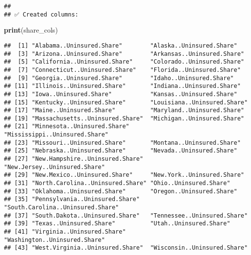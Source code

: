 \documentclass[
]{article}
\newenvironment{Shaded}{\begin{snugshade}}{\end{snugshade}}
\newcommand{\AttributeTok}[1]{\textcolor[rgb]{0.13,0.29,0.53}{#1}}
\newcommand{\CommentTok}[1]{\textcolor[rgb]{0.56,0.35,0.01}{\textit{#1}}}
\newcommand{\ConstantTok}[1]{\textcolor[rgb]{0.56,0.35,0.01}{#1}}
\newcommand{\FunctionTok}[1]{\textcolor[rgb]{0.13,0.29,0.53}{\textbf{#1}}}
\newcommand{\NormalTok}[1]{#1}
\newcommand{\OtherTok}[1]{\textcolor[rgb]{0.56,0.35,0.01}{#1}}
\newcommand{\SpecialCharTok}[1]{\textcolor[rgb]{0.81,0.36,0.00}{\textbf{#1}}}
\newcommand{\StringTok}[1]{\textcolor[rgb]{0.31,0.60,0.02}{#1}}
\begin{document}
\begin{Shaded}
\end{Shaded}

\begin{verbatim}
## 
## ✅ Created columns:
\end{verbatim}

\begin{Shaded}
\begin{Highlighting}[]
\FunctionTok{print}\NormalTok{(share\_cols)}
\end{Highlighting}
\end{Shaded}

\begin{verbatim}
##  [1] "Alabama..Uninsured.Share"        "Alaska..Uninsured.Share"        
##  [3] "Arizona..Uninsured.Share"        "Arkansas..Uninsured.Share"      
##  [5] "California..Uninsured.Share"     "Colorado..Uninsured.Share"      
##  [7] "Connecticut..Uninsured.Share"    "Florida..Uninsured.Share"       
##  [9] "Georgia..Uninsured.Share"        "Idaho..Uninsured.Share"         
## [11] "Illinois..Uninsured.Share"       "Indiana..Uninsured.Share"       
## [13] "Iowa..Uninsured.Share"           "Kansas..Uninsured.Share"        
## [15] "Kentucky..Uninsured.Share"       "Louisiana..Uninsured.Share"     
## [17] "Maine..Uninsured.Share"          "Maryland..Uninsured.Share"      
## [19] "Massachusetts..Uninsured.Share"  "Michigan..Uninsured.Share"      
## [21] "Minnesota..Uninsured.Share"      "Mississippi..Uninsured.Share"   
## [23] "Missouri..Uninsured.Share"       "Montana..Uninsured.Share"       
## [25] "Nebraska..Uninsured.Share"       "Nevada..Uninsured.Share"        
## [27] "New.Hampshire..Uninsured.Share"  "New.Jersey..Uninsured.Share"    
## [29] "New.Mexico..Uninsured.Share"     "New.York..Uninsured.Share"      
## [31] "North.Carolina..Uninsured.Share" "Ohio..Uninsured.Share"          
## [33] "Oklahoma..Uninsured.Share"       "Oregon..Uninsured.Share"        
## [35] "Pennsylvania..Uninsured.Share"   "South.Carolina..Uninsured.Share"
## [37] "South.Dakota..Uninsured.Share"   "Tennessee..Uninsured.Share"     
## [39] "Texas..Uninsured.Share"          "Utah..Uninsured.Share"          
## [41] "Virginia..Uninsured.Share"       "Washington..Uninsured.Share"    
## [43] "West.Virginia..Uninsured.Share"  "Wisconsin..Uninsured.Share"
\end{verbatim}
\end{document}
